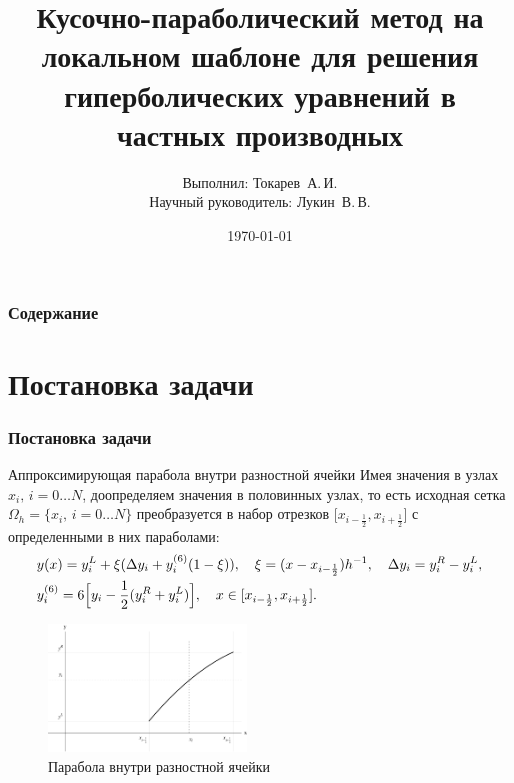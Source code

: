 \documentclass[unicode, 8pt]{beamer}
\title[Курсовая работа]{Кусочно-параболический метод на локальном шаблоне для решения гиперболических уравнений в частных производных}
\author[Токарев А.\,И.]{Выполнил: Токарев~А.\,И.\\[1ex]  {Научный руководитель: Лукин~В.\,В.}}
\institute[]{МГТУ им. Н.Э. Баумана}
\date{\today}
\newcommand{\half}{\frac{1}{2}}
\begin{document}
    \begin{frame}
        \titlepage
    \end{frame}

    \begin{frame}
        \frametitle{Содержание}
        \tableofcontents
    \end{frame}

    \section{Постановка задачи}

    \begin{frame}
        \frametitle{Постановка задачи}
        \begin{block}{Аппроксимирующая парабола внутри разностной ячейки}
            Имея значения в узлах $x_i,\, i = 0 \ldots N$, доопределяем значения в половинных узлах, то есть исходная сетка $\Omega_h = \{ x_i,\, i = 0 \ldots N \}$ преобразуется в набор отрезков $\bigl[ x_{i-\half}, x_{i+\half} \bigr]$ с определенными в них параболами:
            \begin{equation}
                \label{parabolic_eq}
                \begin{split}
                    &y(x) = y_i^L + \xi(\Delta y_i + y_i^{(6)}(1 - \xi)), \quad \xi = (x - x_{i-\half})h^{-1}, \quad  \Delta y_i = y_i^R-y_i^L, 
                    \\
                   &y_i^{(6)} = 6\Bigl[ y_i - \half(y_i^R + y_i^L)\Bigr], \quad x \in [x_{i-\half}, x_{i + \half}]. 
                \end{split}
            \end{equation}
        \end{block}

        \begin{figure}[h]
            \centering
            \includegraphics[width=0.47\textwidth]{ppm_visual.pdf}
            \caption{Парабола внутри разностной ячейки}
            \label{fig:ppm_visual}
        \end{figure}
    \end{frame}
\end{document}
